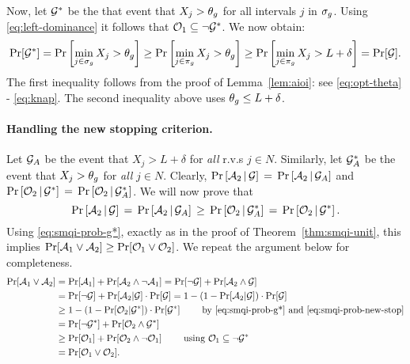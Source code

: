 \documentclass[11pt]{article}
\theoremstyle{remark}
\theoremstyle{plain}
\theoremstyle{remark}
\begin{document}
Now, let ${\cal G}^*$ be the that event that $X_j > \theta_g$ for all intervals $j$ in   $\sigma_g$. Using \eqref{eq:left-dominance} it follows that ${\cal O}_1\subseteq \neg {\cal G}^*$.  We now obtain:
\begin{equation}\label{eq:smqi-prob-g*}
\Pr[{\cal G}^*] = \Pr\left[\min_{j \in \sigma_g} X_j  > \theta_g\right] \ge   \Pr\left[\min_{j \in \pi_g} X_j  > \theta_g\right]\ge   \Pr\left[\min_{j \in \pi_g} X_j  > L+\delta \right] = \Pr[{\cal G}].
\end{equation}
 The first inequality follows from the proof of Lemma~\ref{lem:aioi}: see \eqref{eq:opt-theta} - \eqref{eq:knap}. The second inequality above uses $\theta_g\le L+\delta$.   

\paragraph{Handling the new stopping criterion.} Let ${\cal G}_A$ be the event that $X_j>L+\delta$ for {\em all} r.v.s $j\in N$. Similarly, let ${\cal G}^*_A$ be the event that $X_j>\theta_g$ for {\em  all}  $j\in N$. Clearly,
$\Pr\left[{\cal A}_2\, |\, {\cal G}\right]  \,=\, \Pr\left[{\cal A}_2\, |\,  {\cal G}_A\right]$  and $ \Pr\left[{\cal O}_2\, |\, {\cal G}^*\right]  \,=\, \Pr\left[{\cal O}_2\, |\,  {\cal G}^*_A\right]$.  
  We will now prove that
 \begin{equation}\label{eq:smqi-prob-new-stop}
\Pr\left[{\cal A}_2\, |\, {\cal G}\right]  \,=\, \Pr\left[{\cal A}_2\, |\, {\cal G}_A\right] \,\ge\,  \Pr\left[{\cal O}_2\, | \, {\cal G}^*_A\right] \,=\, \Pr\left[{\cal O}_2\, |\, {\cal G}^*\right] .
\end{equation}
Using \eqref{eq:smqi-prob-g*}, exactly as in the proof of Theorem~\ref{thm:smqi-unit}, this  implies 
$\Pr[{\cal A}_1 \vee {\cal A}_2]  \ge  \Pr[{\cal O}_1 \vee {\cal O}_2]$. We repeat the argument below for completeness.
\begin{align*}
    \Pr[{\cal A}_1 \vee {\cal A}_2] &=     \Pr[{\cal A}_1] +     \Pr[{\cal A}_2 \wedge \neg {\cal A}_1] = \Pr[\neg {\cal G}] + \Pr[{\cal A}_2 \wedge  {\cal G}]\\
    & = \Pr[\neg {\cal G}] + \Pr[{\cal A}_2 |{\cal G}]\cdot \Pr[{\cal G}] = 1 - \left( 1 -  \Pr[{\cal A}_2 |{\cal G}]\right) \cdot \Pr[{\cal G}]\\
    & \ge 1 - \left( 1 -  \Pr[{\cal O}_2 |{\cal G}^*]\right) \cdot \Pr[{\cal G}^*]\qquad \text{ by \eqref{eq:smqi-prob-g*} and \eqref{eq:smqi-prob-new-stop}}\\
    &= \Pr[\neg {\cal G}^*] + \Pr[{\cal O}_2 \wedge  {\cal G}^*]\\
    & \ge \Pr[{\cal O}_1] +     \Pr[{\cal O}_2 \wedge \neg {\cal O}_1] \qquad \text{ using  }{\cal O}_1\subseteq \neg {\cal G}^* \\
    & =    \Pr[{\cal O}_1 \vee {\cal O}_2].
\end{align*}
\end{document}
